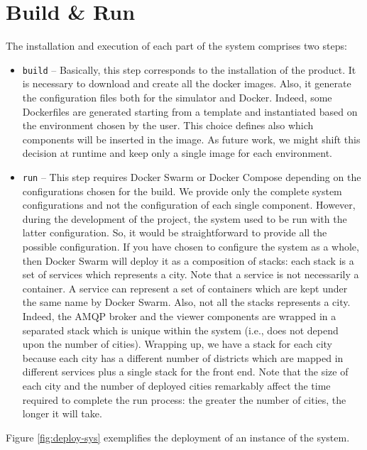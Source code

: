 \section{Build \& Run}
The installation and execution of each part of the system comprises two steps:

\begin{itemize}
   \item \texttt{build} --
   Basically, this step corresponds to the installation of the product.
   It is necessary to download and create all the docker
   images. Also, it generate the configuration files both for the simulator and
   Docker. Indeed, some Dockerfiles are generated starting from a template and
   instantiated based on the environment chosen by the user. This choice defines
   also which components will be inserted in the image. As future work,
   we might shift this decision at runtime and keep only a single image for each
   environment.
   \item \texttt{run} --
   This step requires Docker Swarm
	or Docker Compose depending on the configurations chosen for the build.
	We provide only the complete system configurations and not the
	configuration of each single component.
   However, during the development of the project,
	the system used to be run with the latter configuration.
	So, it would be straightforward to provide all the possible configuration.
	If you have chosen to configure the system as a whole, then Docker Swarm
   will deploy it as a composition of stacks:
   each stack is a set of services which represents
   a city. Note that a service is not necessarily a container.
   A service can represent a set of containers which are kept under the same
   name by Docker Swarm.
   Also, not all the stacks represents a city. Indeed, the AMQP broker
   and the viewer components are wrapped in a separated
   stack which is unique within the system (i.e., does not depend upon the
   number of cities). Wrapping up, we have a stack for each city because
   each city has a different number of districts which are mapped in different
   services plus a single stack for the front end.
   Note that the size of each city and the number of deployed
   cities remarkably affect the time required to complete the run process:
   the greater the number of cities, the longer it will take.
\end{itemize}

Figure \ref{fig:deploy-sys} exemplifies the deployment of an instance of the
system.

